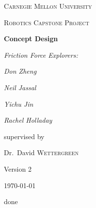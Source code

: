 \documentclass[a4paper,10pt]{article}
\begin{document}
\begin{titlepage}
	\centering
	{\scshape\LARGE Carnegie Mellon University \par}
	\vspace{1cm}
	{\scshape\Large Robotics Capstone Project\par}
	\vspace{1.5cm}
	{\huge\bfseries Concept Design\par}
	\vspace{2cm}
	{\Large\itshape Friction Force Explorers:\par}
	\vspace{1cm}
	{\Large\itshape Don Zheng\par}
	{\Large\itshape Neil Jassal\par}
	{\Large\itshape Yichu Jin\par}
	{\Large\itshape Rachel Holladay\par}
	\vfill
	supervised by\par
	Dr.~David \textsc{Wettergreen}

	\vfill

	{\large Version 2\par
	\today\par}
\end{titlepage}

\tableofcontents
\listoffigures
\clearpage





 done

 

 

 
 


%
%


{\footnotesize

}
\end{document}
